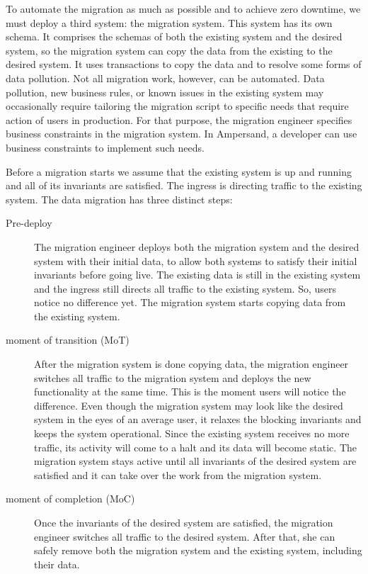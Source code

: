 \documentclass[runningheads]{llncs}
\begin{document}
   To automate the migration as much as possible and to achieve zero downtime,
   we must deploy a third system: the migration system.
   This system has its own schema.
   It comprises the schemas of both the existing system and the desired system,
   so the migration system can copy the data from the existing to the desired system.
   It uses transactions to copy the data and to resolve some forms of data pollution.
   Not all migration work, however, can be automated.
   Data pollution, new business rules, or known issues in the existing system
   may occasionally require tailoring the migration script to specific needs
   that require action of users in production.
   For that purpose, the migration engineer specifies business constraints in the migration system.
   In Ampersand, a developer can use business constraints to implement such needs.

   Before a migration starts we assume that the existing system is up and running and all of its invariants are satisfied.
   The ingress is directing traffic to the existing system.
   The data migration has three distinct steps:
\begin{description}
\item[Pre-deploy]
      The migration engineer deploys both the migration system and the desired system with their initial data,
      to allow both systems to satisfy their initial invariants before going live.
      The existing data is still in the existing system and the ingress still directs all traffic to the existing system.
      So, users notice no difference yet.
      The migration system starts copying data from the existing system.
\item[moment of transition (MoT)]
      After the migration system is done copying data, the migration engineer switches all traffic to the migration system
      and deploys the new functionality at the same time.
      This is the moment users will notice the difference.
      Even though the migration system may look like the desired system in the eyes of an average user,
      it relaxes the blocking invariants and keeps the system operational.
      Since the existing system receives no more traffic, its activity will come to a halt and its data will become static.
      The migration system stays active until all invariants of the desired system are satisfied and it can take over the work from the migration system.
\item[moment of completion (MoC)]
      Once the invariants of the desired system are satisfied, the migration engineer switches all traffic to the desired system.
      After that, she can safely remove both the migration system and the existing system, including their data.
\end{description}
\end{document}
